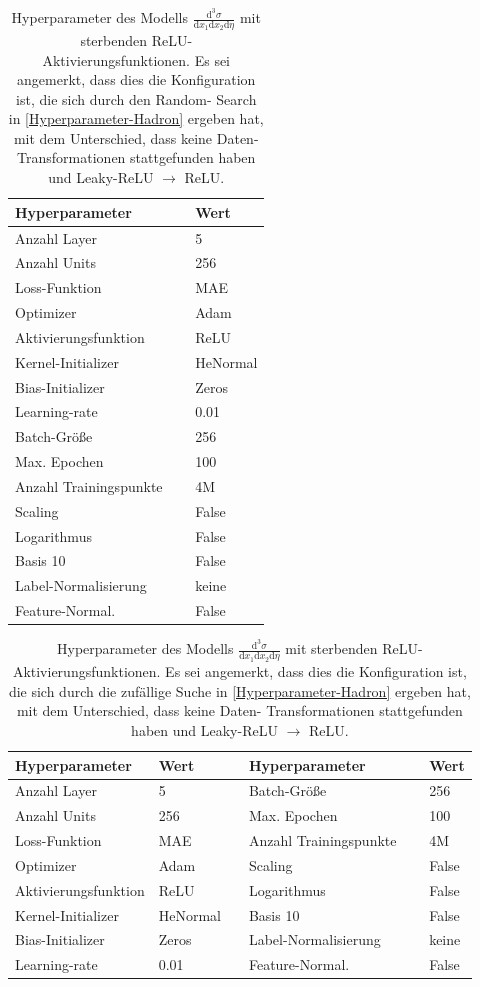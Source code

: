 \begin{table}[hbt]
	\centering
	\begin{tabular}{ll}
		Hyperparameter & Wert \\
		\hline \hline
		Anzahl Layer & 5 \\
		Anzahl Units & 256 \\
		Loss-Funktion & MAE \\
		Optimizer & Adam \\
		Aktivierungsfunktion & ReLU \\
		Kernel-Initializer & HeNormal \\
		Bias-Initializer & Zeros \\
		Learning-rate & 0.01 \\
		Batch-Größe & 256 \\
		Max. Epochen & 100 \\
		Anzahl Trainingspunkte $\quad$& 4M\\
		Scaling & False \\
		Logarithmus & False \\
		Basis 10 & False \\
		Label-Normalisierung & keine \\
		Feature-Normal. & False \\
	\end{tabular}
	\caption{Hyperparameter des Modells $\frac{\text{d}^3\sigma}{\text{d}x_1 \text{d}x_2\text{d}\eta}$ mit sterbenden ReLU- Aktivierungsfunktionen. Es sei angemerkt, dass dies die Konfiguration ist, die sich durch den Random- Search in \textsf{\autoref{Hyperparameter-Hadron}} ergeben hat, mit dem Unterschied, dass keine Daten- Transformationen stattgefunden haben und Leaky-ReLU $\rightarrow$ ReLU.}
	\label{Hyperparameter-Eta}
\end{table}
\begin{table}
	\centering
	\captionsetup{
		justification=justified
	}
	\caption{Hyperparameter des Modells $\frac{\text{d}^3\sigma}{\text{d}x_1 \text{d}x_2\text{d}\eta}$ mit sterbenden ReLU- Aktivierungsfunktionen. Es sei angemerkt, dass dies die Konfiguration ist, die sich durch die zufällige Suche in \textsf{\autoref{Hyperparameter-Hadron}} ergeben hat, mit dem Unterschied, dass keine Daten- Transformationen stattgefunden haben und Leaky-ReLU $\rightarrow$ ReLU.}
	\begin{tabular}{ll|ll}
		Hyperparameter & Wert & Hyperparameter & Wert \\
		\hline \hline
		Anzahl Layer & 5 & 		Batch-Größe & 256 \\
		Anzahl Units & 256 & 		Max. Epochen & 100\\
		Loss-Funktion & MAE & 		Anzahl Trainingspunkte $\quad$& 4M\\
		Optimizer & Adam &		Scaling & False \\
		Aktivierungsfunktion & ReLU & 		Logarithmus & False\\
		Kernel-Initializer & HeNormal$\quad$ & 		Basis 10 & False \\
		Bias-Initializer & Zeros &		Label-Normalisierung & keine \\
		Learning-rate & 0.01 & 		Feature-Normal. & False\\
		\hline
	\end{tabular}
	\label{Config-no-trans}
\end{table}